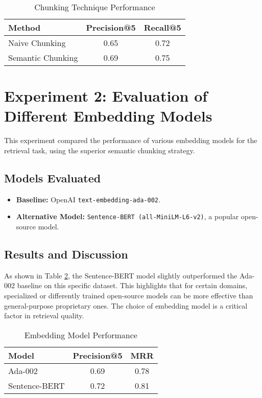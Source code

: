 \begin{table}[h!]
\centering
\caption{Chunking Technique Performance}
\label{tab:chunking_results}
\begin{tabular}{|l|c|c|}
\hline
\textbf{Method} & \textbf{Precision@5} & \textbf{Recall@5} \\
\hline
Naive Chunking & 0.65 & 0.72 \\
Semantic Chunking & 0.69 & 0.75 \\
\hline
\end{tabular}
\end{table}

\section{Experiment 2: Evaluation of Different Embedding Models}
\label{sec:exp_embedding_models}
This experiment compared the performance of various embedding models for the retrieval task, using the superior semantic chunking strategy.
\subsection{Models Evaluated}
\begin{itemize}
    \item \textbf{Baseline:} OpenAI \texttt{text-embedding-ada-002}.
    \item \textbf{Alternative Model:} \texttt{Sentence-BERT (all-MiniLM-L6-v2)}, a popular open-source model.
\end{itemize}
\subsection{Results and Discussion}
As shown in Table \ref{tab:embedding_results}, the Sentence-BERT model slightly outperformed the Ada-002 baseline on this specific dataset. This highlights that for certain domains, specialized or differently trained open-source models can be more effective than general-purpose proprietary ones. The choice of embedding model is a critical factor in retrieval quality.

\begin{table}[h!]
\centering
\caption{Embedding Model Performance}
\label{tab:embedding_results}
\begin{tabular}{|l|c|c|}
\hline
\textbf{Model} & \textbf{Precision@5} & \textbf{MRR} \\
\hline
Ada-002 & 0.69 & 0.78 \\
Sentence-BERT & 0.72 & 0.81 \\
\hline
\end{tabular}
\end{table}

